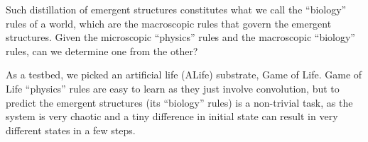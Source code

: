 \documentclass{article}
\begin{document}
Such distillation of emergent structures constitutes what we call the ``biology'' rules of a world, which are the macroscopic rules that govern the emergent structures. 
Given the microscopic ``physics'' rules and the macroscopic ``biology'' rules, can we determine one from the other? 


As a testbed, we picked an artificial life (ALife) substrate, Game of Life. 
Game of Life ``physics'' rules are easy to learn as they just involve convolution, but to predict the emergent structures (its ``biology'' rules) is a non-trivial task, as the system is very chaotic and a tiny difference in initial state can result in very different states in a few steps. 
\end{document}
